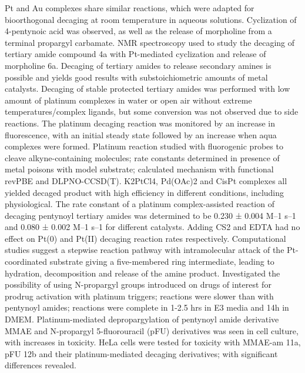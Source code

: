 Pt and Au complexes share similar reactions, which were adapted for bioorthogonal decaging at room temperature in aqueous solutions.
Cyclization of 4-pentynoic acid was observed, as well as the release of morpholine from a terminal propargyl carbamate.
NMR spectroscopy used to study the decaging of tertiary amide compound 4a with Pt-mediated cyclization and release of morpholine 6a.
Decaging of tertiary amides to release secondary amines is possible and yields good results with substoichiometric amounts of metal catalysts.
Decaging of stable protected tertiary amides was performed with low amount of platinum complexes in water or open air without extreme temperatures/complex ligands, but some conversion was not observed due to side reactions.
The platinum decaging reaction was monitored by an increase in fluorescence, with an initial steady state followed by an increase when aqua complexes were formed.
Platinum reaction studied with fluorogenic probes to cleave alkyne-containing molecules; rate constants determined in presence of metal poisons with model substrate; calculated mechanism with functional revPBE and DLPNO-CCSD(T).
K2PtCl4, Pd(OAc)2 and CisPt complexes all yielded decaged product with high efficiency in different conditions, including physiological.
The rate constant of a platinum complex-assisted reaction of decaging pentynoyl tertiary amides was determined to be 0.230 ± 0.004 M–1 s–1 and 0.080 ± 0.002 M–1 s–1 for different catalysts.
Adding CS2 and EDTA had no effect on Pt(0) and Pt(II) decaging reaction rates respectively.
Computational studies suggest a stepwise reaction pathway with intramolecular attack of the Pt-coordinated substrate giving a five-membered ring intermediate, leading to hydration, decomposition and release of the amine product.
Investigated the possibility of using N-propargyl groups introduced on drugs of interest for prodrug activation with platinum triggers; reactions were slower than with pentynoyl amides; reactions were complete in 1-2.5 hrs in E3 media and 14h in DMEM.
Platinum-mediated depropargylation of pentynoyl amide derivative MMAE and N-propargyl 5-fluorouracil (pFU) derivatives was seen in cell culture, with increases in toxicity.
HeLa cells were tested for toxicity with MMAE-am 11a, pFU 12b and their platinum-mediated decaging derivatives; with significant differences revealed.
